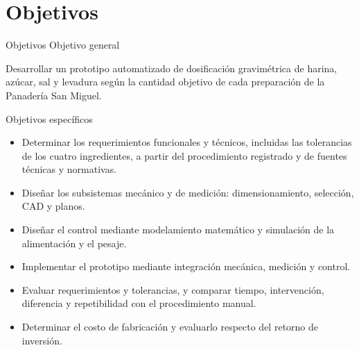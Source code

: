 \documentclass[aspectratio=169,spanish]{beamer}
\begin{document}
\section{Objetivos}
\begin{frame}{Objetivos}
\relax
{\large\color{UCBBlue}Objetivo general}
\par\smallskip
Desarrollar un prototipo automatizado de dosificación gravimétrica de harina, azúcar, sal y levadura según la cantidad objetivo de cada preparación de la Panadería San Miguel.
\par\medskip
{\large\color{UCBBlue}Objetivos específicos}
\begin{itemize}\small
\setlength{\itemsep}{0.10cm}
\item Determinar los requerimientos funcionales y técnicos, incluidas las tolerancias de los cuatro ingredientes, a partir del procedimiento registrado y de fuentes técnicas y normativas.
\item Diseñar los subsistemas mecánico y de medición: dimensionamiento, selección, CAD y planos.
\item Diseñar el control mediante modelamiento matemático y simulación de la alimentación y el pesaje.
\item Implementar el prototipo mediante integración mecánica, medición y control.
\item Evaluar requerimientos y tolerancias, y comparar tiempo, intervención, diferencia y repetibilidad con el procedimiento manual.
\item Determinar el costo de fabricación y evaluarlo respecto del retorno de inversión.
\end{itemize}
\end{frame}
\end{document}
